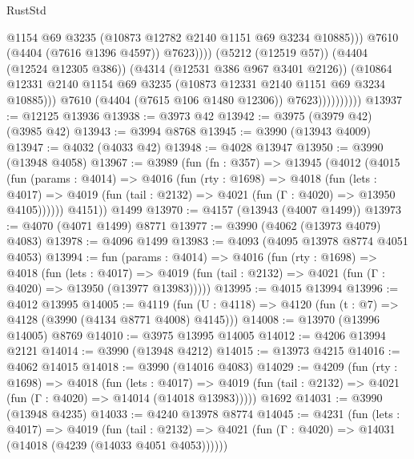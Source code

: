 \begin{lexlean}{RustStd}
\begin{coremodule}
                                      @1154
                                      @69
                                      @3235
                                      (@10873 @12782 @2140 @1151 @69 @3234 @10885)))
                                  @7610
                                  (@4404 (@7616 @1396 @4597))
                                  @7623))))
                          (@5212 (@12519 @57))
                          (@4404 (@12524 @12305 @386))
                          (@4314 (@12531 @386 @967 @3401 @2126))
                          (@10864
                            @12331
                            @2140
                            @1154
                            @69
                            @3235
                            (@10873 @12331 @2140 @1151 @69 @3234 @10885)))
                        @7610
                        (@4404 (@7615 @106 @1480 @12306))
                        @7623))))))))))
@13937 := @12125 @13936
@13938 := @3973 @42
@13942 := @3975 (@3979 @42) (@3985 @42)
@13943 := @3994 @8768
@13945 := @3990 (@13943 @4009)
@13947 := @4032 (@4033 @42)
@13948 := @4028 @13947
@13950 := @3990 (@13948 @4058)
@13967 := @3989
    (fun (fn : @357) =>
    @13945
      (@4012
        (@4015
          (fun (params : @4014) =>
          @4016
            (fun (rty : @1698) =>
            @4018
              (fun (lets : @4017) =>
              @4019 (fun (tail : @2132) => @4021 (fun (Γ : @4020) => @13950 @4105))))))
        @4151))
    @1499
@13970 := @4157 (@13943 (@4007 @1499))
@13973 := @4070 (@4071 @1499) @8771
@13977 := @3990 (@4062 (@13973 @4079) @4083)
@13978 := @4096 @1499
@13983 := @4093 (@4095 @13978 @8774 @4051 @4053)
@13994 := fun (params : @4014) =>
  @4016
    (fun (rty : @1698) =>
    @4018
      (fun (lets : @4017) =>
      @4019 (fun (tail : @2132) => @4021 (fun (Γ : @4020) => @13950 (@13977 @13983)))))
@13995 := @4015 @13994
@13996 := @4012 @13995
@14005 := @4119 (fun (U : @4118) => @4120 (fun (t : @7) => @4128 (@3990 (@4134 @8771 @4008) @4145)))
@14008 := @13970 (@13996 @14005) @8769
@14010 := @3975 @13995 @14005
@14012 := @4206 @13994 @2121
@14014 := @3990 (@13948 @4212)
@14015 := @13973 @4215
@14016 := @4062 @14015
@14018 := @3990 (@14016 @4083)
@14029 := @4209
    (fun (rty : @1698) =>
    @4018
      (fun (lets : @4017) =>
      @4019 (fun (tail : @2132) => @4021 (fun (Γ : @4020) => @14014 (@14018 @13983)))))
    @1692
@14031 := @3990 (@13948 @4235)
@14033 := @4240 @13978 @8774
@14045 := @4231
    (fun (lets : @4017) =>
    @4019
      (fun (tail : @2132) =>
      @4021 (fun (Γ : @4020) => @14031 (@14018 (@4239 (@14033 @4051 @4053))))))

\end{coremodule}
\end{lexlean}
